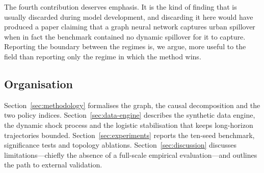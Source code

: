 The fourth contribution deserves emphasis. It is the kind of finding that is
usually discarded during model development, and discarding it here would have
produced a paper claiming that a graph neural network captures urban spillover
when in fact the benchmark contained no dynamic spillover for it to capture.
Reporting the boundary between the regimes is, we argue, more useful to the
field than reporting only the regime in which the method wins.

\subsection{Organisation}

Section~\ref{sec:methodology} formalises the graph, the causal decomposition
and the two policy indices. Section~\ref{sec:data-engine} describes the
synthetic data engine, the dynamic shock process and the logistic stabilisation
that keeps long-horizon trajectories bounded.
Section~\ref{sec:experiments} reports the ten-seed benchmark, significance
tests and topology ablations. Section~\ref{sec:discussion} discusses
limitations---chiefly the absence of a full-scale empirical
evaluation---and outlines the path to external validation.
